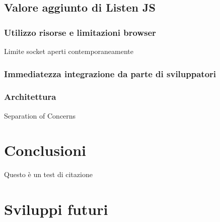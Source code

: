 \documentclass[12pt,a4paper,openright]{report}
\begin{document}
\section{Valore aggiunto di Listen JS}\label{sec_valorelistenjs}

\subsection{Utilizzo risorse e limitazioni browser}
Limite socket aperti contemporaneamente

\subsection{Immediatezza integrazione da parte di sviluppatori}

\subsection{Architettura}
Separation of Concerns

\clearpage{\pagestyle{empty}\cleardoublepage}
\chapter*{Conclusioni}

Questo è un test di citazione \cite{websockets}

\chapter{Sviluppi futuri}

\clearpage{\pagestyle{empty}\cleardoublepage}




\end{document}
